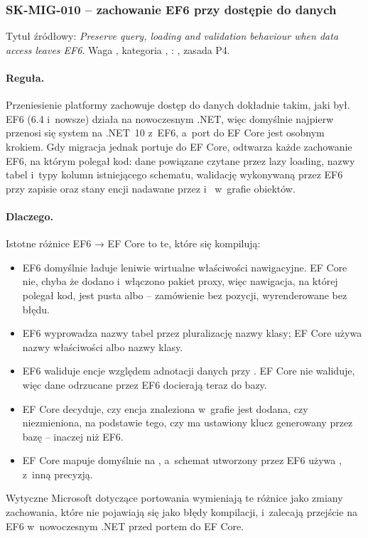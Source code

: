 
\subsubsection{SK-MIG-010 -- zachowanie EF6 przy dostępie do danych}\label{sec:standardy-sk-mig-010}

Tytuł źródłowy: \emph{Preserve query, loading and validation behaviour when data access
leaves EF6}. Waga , kategoria , :
, zasada P4.

\paragraph{Reguła.} Przeniesienie platformy zachowuje dostęp do danych dokładnie takim, jaki
był. EF6 (6.4 i~nowsze) działa na nowoczesnym .NET, więc domyślnie najpierw przenosi się
system na .NET~10 z~EF6, a~port do EF Core jest osobnym krokiem. Gdy migracja jednak portuje
do EF Core, odtwarza każde zachowanie EF6, na którym polegał kod: dane powiązane czytane przez
lazy loading, nazwy tabel i~typy kolumn istniejącego schematu, walidację wykonywaną przez EF6
przy zapisie oraz stany encji nadawane przez  i~ w~grafie
obiektów.

\paragraph{Dlaczego.} Istotne różnice EF6 → EF Core to te, które się kompilują:
\begin{itemize}
  \item EF6 domyślnie ładuje leniwie wirtualne właściwości nawigacyjne. EF Core nie, chyba że
        dodano i~włączono pakiet proxy, więc nawigacja, na której polegał kod, jest pusta albo
         -- zamówienie bez pozycji, wyrenderowane bez błędu.
  \item EF6 wyprowadza nazwy tabel przez pluralizację nazwy klasy; EF Core używa nazwy
        właściwości  albo nazwy klasy.
  \item EF6 waliduje encje względem adnotacji danych przy . EF Core nie
        waliduje, więc dane odrzucane przez EF6 docierają teraz do bazy.
  \item EF Core decyduje, czy encja znaleziona w~grafie jest dodana, czy niezmieniona, na
        podstawie tego, czy ma ustawiony klucz generowany przez bazę -- inaczej niż EF6.
  \item EF Core mapuje domyślnie  na , a~schemat
        utworzony przez EF6 używa , z~inną precyzją.
\end{itemize}
Wytyczne Microsoft dotyczące portowania wymieniają te różnice jako zmiany zachowania, które
nie pojawiają się jako błędy kompilacji, i~zalecają przejście na EF6 w~nowoczesnym .NET przed
portem do EF Core.

